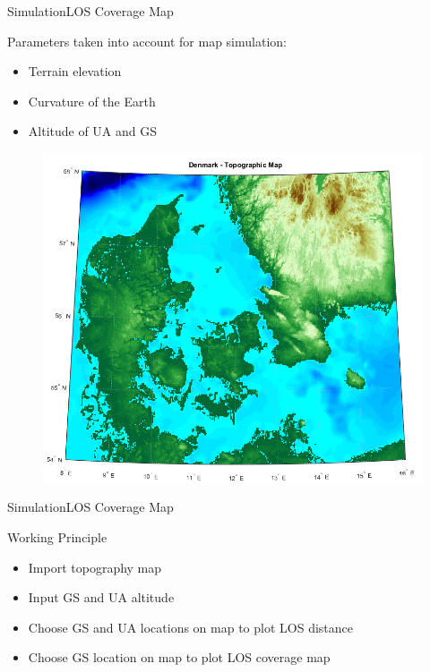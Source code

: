 
\begin{frame}{Simulation}{LOS Coverage Map}
  \begin{block}{Parameters taken into account for map simulation:}

	  \begin{itemize}
	  	\item Terrain elevation
	  	\item Curvature of the Earth
	  	\item Altitude of UA and GS
	  \end{itemize}

	  \begin{figure}
        \includegraphics[scale=0.26]{../report/figures/dk_map.png}
      \end{figure}
  
  \end{block}
\end{frame}

\begin{frame}{Simulation}{LOS Coverage Map}
  \begin{block}{Working Principle}
	  \begin{itemize}
	  	\item Import topography map
	  	\item Input GS and UA altitude
	  	\item Choose GS and UA locations on map to plot LOS distance
	  	\item Choose GS location on map to plot LOS coverage map
	  \end{itemize}
  \end{block}
\end{frame}

